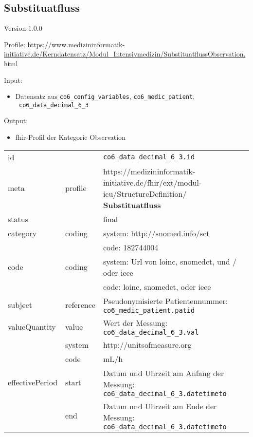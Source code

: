 \subsection{Substituatfluss} 
\noindent Version 1.0.0

\noindent Profile: \url{https://www.medizininformatik-initiative.de/Kerndatensatz/Modul_Intensivmedizin/SubstituatflussObservation.html}

\noindent Input:
\begin{itemize}
	\item Datensatz aus \texttt{co6\_config\_variables}, \texttt{co6\_medic\_patient}, \\ \texttt{
co6\_data\_decimal\_6\_3}
\end{itemize}
Output:
\begin{itemize}
        \item \ac{fhir}-Profil der Kategorie \glqq Observation\grqq{}
\end{itemize}
\begin{longtable}{|l|l|p{7.5cm}|}
        \hline
        \rowcolor{lightgray} \multicolumn{3}{|l|}{Data Mapping (inhaltlich)} \\ \hline
        id &  & \texttt{co6\_data\_decimal\_6\_3.id} \\ \hline
	meta & profile & https://medizininformatik-initiative.de/fhir/ext/modul-icu/StructureDefinition/\textbf{
Substituatfluss} \\ \hline 
	status &  & final  \\ \hline 
	category & coding & system: \url{http://snomed.info/sct} \\
\cline{3-3}
	& & code: 182744004 \\ \hline
	code & coding & system: Url von \ac{loinc}, \ac{snomedct}, und / oder \ac{ieee} \\ 
	\cline{3-3} 
	 &  & code: \ac{loinc}, \ac{snomedct}, oder \ac{ieee} \\ \hline
	subject & reference & Pseudonymisierte Patientennummer: \texttt{co6\_medic\_patient.patid} \\ \hline
	valueQuantity & value & Wert der Messung: \texttt{
co6\_data\_decimal\_6\_3.val} \\
        \cline{2-3}
         & system & http://unitsofmeasure.org \\
         \cline{2-3}
         & code & mL/h \\ \hline
    effectivePeriod & start & Datum und Uhrzeit am Anfang der Messung: \texttt{
co6\_data\_decimal\_6\_3.datetimeto} \\
    \cline{2-3}
     & end & Datum und Uhrzeit am Ende der Messung: \texttt{
co6\_data\_decimal\_6\_3.datetimeto} \\ \hline
\end{longtable}


